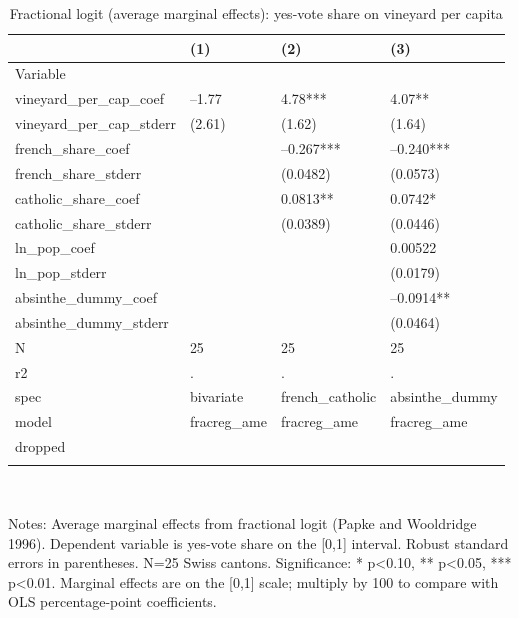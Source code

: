 \documentclass{article}
\begin{document}
\begin{table}[tbp] \centering
{}

\caption{Fractional logit (average marginal effects): yes-vote share on vineyard per capita}
\label{tab:fracreg}
\begin{tabularx}{\linewidth}{@{}lCCC@{}}

\toprule
&{(1)}&{(2)}&{(3)} \tabularnewline \midrule
{Variable}&{}&{}&{} \tabularnewline
\midrule \addlinespace[\belowrulesep]
vineyard\_per\_cap\_coef&--1.77&4.78***&4.07** \tabularnewline
vineyard\_per\_cap\_stderr&(2.61)&(1.62)&(1.64) \tabularnewline
french\_share\_coef&&--0.267***&--0.240*** \tabularnewline
french\_share\_stderr&&(0.0482)&(0.0573) \tabularnewline
catholic\_share\_coef&&0.0813**&0.0742* \tabularnewline
catholic\_share\_stderr&&(0.0389)&(0.0446) \tabularnewline
ln\_pop\_coef&&&0.00522 \tabularnewline
ln\_pop\_stderr&&&(0.0179) \tabularnewline
absinthe\_dummy\_coef&&&--0.0914** \tabularnewline
absinthe\_dummy\_stderr&&&(0.0464) \tabularnewline
N&25&25&25 \tabularnewline
r2&.&.&. \tabularnewline
spec&bivariate&french\_catholic&absinthe\_dummy \tabularnewline
model&fracreg\_ame&fracreg\_ame&fracreg\_ame \tabularnewline
dropped&&& \tabularnewline
\bottomrule \addlinespace[\belowrulesep]

\end{tabularx}
\\ \parbox{\linewidth}{\footnotesize Notes: Average marginal effects from fractional logit (Papke and Wooldridge 1996). Dependent variable is yes-vote share on the [0,1] interval. Robust standard errors in parentheses. N=25 Swiss cantons. Significance: * p<0.10, ** p<0.05, *** p<0.01. Marginal effects are on the [0,1] scale; multiply by 100 to compare with OLS percentage-point coefficients.}
\end{table}
\end{document}
